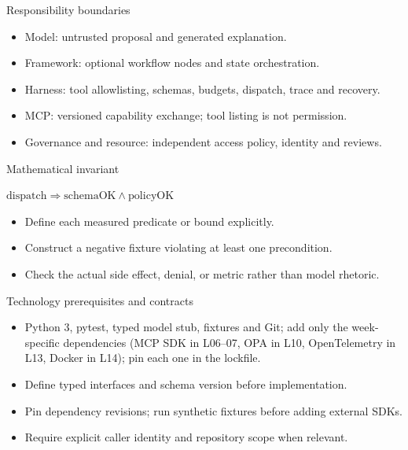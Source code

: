 \documentclass[aspectratio=169,10pt]{beamer}
\begin{document}
\begin{frame}{Responsibility boundaries}
\small
\begin{itemize}
\item Model: untrusted proposal and generated explanation.
\item Framework: optional workflow nodes and state orchestration.
\item Harness: tool allowlisting, schemas, budgets, dispatch, trace and recovery.
\item MCP: versioned capability exchange; tool listing is not permission.
\item Governance and resource: independent access policy, identity and reviews.
\end{itemize}

\end{frame}

\begin{frame}{Mathematical invariant}
\small
\begin{center}\Large $\mathrm{dispatch}\Rightarrow\mathrm{schemaOK}\land\mathrm{policyOK}$\end{center}
\begin{itemize}
\item Define each measured predicate or bound explicitly.
\item Construct a negative fixture violating at least one precondition.
\item Check the actual side effect, denial, or metric rather than model rhetoric.
\end{itemize}

\end{frame}

\begin{frame}{Technology prerequisites and contracts}
\small
\begin{itemize}
\item Python 3, pytest, typed model stub, fixtures and Git; add only the week-specific dependencies (MCP SDK in L06--07, OPA in L10, OpenTelemetry in L13, Docker in L14); pin each one in the lockfile.
\item Define typed interfaces and schema version before implementation.
\item Pin dependency revisions; run synthetic fixtures before adding external SDKs.
\item Require explicit caller identity and repository scope when relevant.
\end{itemize}

\end{frame}
\end{document}
